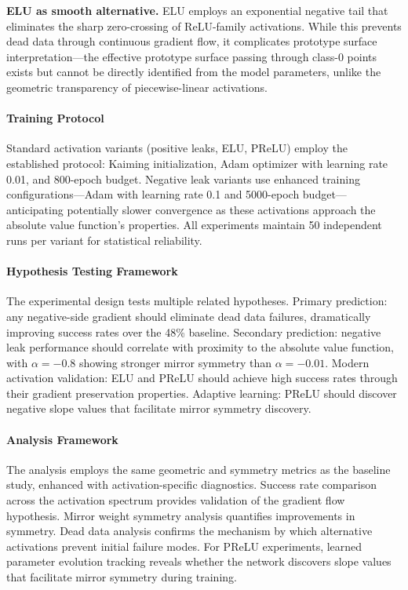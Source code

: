 \textbf{ELU as smooth alternative.} ELU employs an exponential negative tail that eliminates the sharp zero-crossing of ReLU-family activations. While this prevents dead data through continuous gradient flow, it complicates prototype surface interpretation—the effective prototype surface passing through class-0 points exists but cannot be directly identified from the model parameters, unlike the geometric transparency of piecewise-linear activations.

\paragraph{Training Protocol}
Standard activation variants (positive leaks, ELU, PReLU) employ the established protocol: Kaiming initialization, Adam optimizer with learning rate 0.01, and 800-epoch budget. Negative leak variants use enhanced training configurations—Adam with learning rate 0.1 and 5000-epoch budget—anticipating potentially slower convergence as these activations approach the absolute value function's properties. All experiments maintain 50 independent runs per variant for statistical reliability.

\paragraph{Hypothesis Testing Framework}
The experimental design tests multiple related hypotheses. Primary prediction: any negative-side gradient should eliminate dead data failures, dramatically improving success rates over the 48\% baseline. Secondary prediction: negative leak performance should correlate with proximity to the absolute value function, with $\alpha = -0.8$ showing stronger mirror symmetry than $\alpha = -0.01$. Modern activation validation: ELU and PReLU should achieve high success rates through their gradient preservation properties. Adaptive learning: PReLU should discover negative slope values that facilitate mirror symmetry discovery.

\paragraph{Analysis Framework}
The analysis employs the same geometric and symmetry metrics as the baseline study, enhanced with activation-specific diagnostics. Success rate comparison across the activation spectrum provides validation of the gradient flow hypothesis. Mirror weight symmetry analysis quantifies improvements in symmetry. Dead data analysis confirms the mechanism by which alternative activations prevent initial failure modes. For PReLU experiments, learned parameter evolution tracking reveals whether the network discovers slope values that facilitate mirror symmetry during training.

